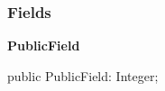 \documentclass{report}
\newif\ifpdf
\begin{document}
\subsubsection*{\large{\textbf{Fields}}\normalsize\hspace{1ex}\hfill}
\begin{list}{}{
\setlength{\itemindent}{0cm}
\setlength{\listparindent}{0cm}
\setlength{\leftmargin}{\evensidemargin}
\addtolength{\leftmargin}{\tmplength}
\settowidth{\labelsep}{X}
\addtolength{\leftmargin}{\labelsep}
\setlength{\labelwidth}{\tmplength}
}
\label{ok_interface_implicit.TMyClass-PublicField}
\item[\textbf{PublicField}\hfill]
\ifpdf
\begin{flushleft}
\fi
\begin{ttfamily}
public PublicField: Integer;\end{ttfamily}

\ifpdf
\end{flushleft}
\fi


\par  \end{list}
\end{document}
